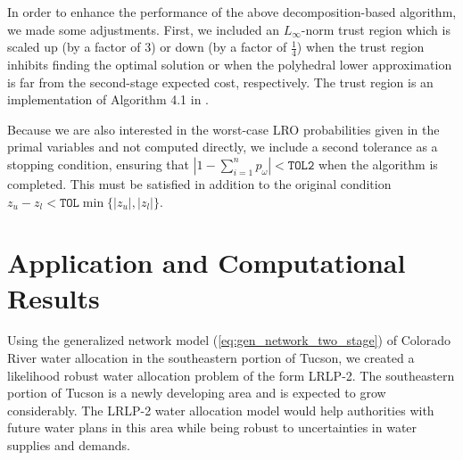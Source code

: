 \documentclass[11pt]{article}
\begin{document}
In order to enhance the performance of the above decomposition-based algorithm, we made some adjustments.
First, we included an $L_\infty$-norm trust region which is scaled up (by a factor of $3$) or down (by a factor of $\tfrac{1}{4}$) when the trust region inhibits finding the optimal solution or when the polyhedral lower approximation is far from the second-stage expected cost, respectively.
The trust region is an implementation of Algorithm 4.1 in \cite{nocedal1999numerical}.

Because we are also interested in the worst-case LRO probabilities given in the primal variables and not computed directly, we include a second tolerance as a stopping condition, ensuring that $\left| 1 - \sum_{i=1}^n p_\omega \right| < \texttt{TOL2}$ when the algorithm is completed.
This must be satisfied in addition to the original condition $z_u - z_l < \texttt{TOL}\min\{|z_u|,|z_l|\}$.

\section{Application and Computational Results} \label{sec:comp_results}

Using the generalized network model (\ref{eq:gen_network_two_stage}) of Colorado River water allocation in the southeastern portion of Tucson, we created a likelihood robust water allocation problem of the form LRLP-2.
The southeastern portion of Tucson is a newly developing area and is expected to grow considerably. 
The LRLP-2 water allocation model would help authorities with future water plans in this area while being robust to uncertainties in water supplies and demands.
\end{document}
